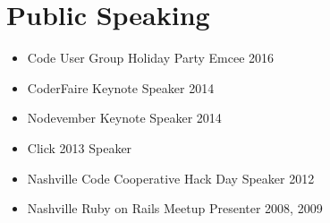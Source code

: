 \section{Public Speaking}

\begin{itemize}\itemsep -2pt
  \item Code User Group Holiday Party Emcee 2016
  \item CoderFaire Keynote Speaker 2014
  \item Nodevember Keynote Speaker 2014
  \item Click 2013 Speaker
  \item Nashville Code Cooperative Hack Day Speaker 2012
  \item Nashville Ruby on Rails Meetup Presenter 2008, 2009
\end{itemize}
